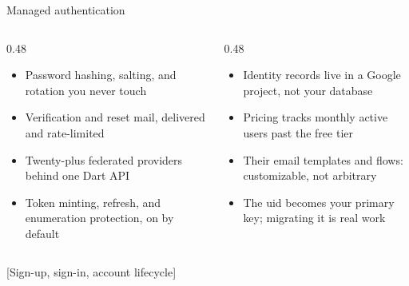 \documentclass[10pt,aspectratio=169,t]{beamer}
\begin{document}
\begin{frame}[eyebrow=Fundamentals]{Managed authentication}
  \vskip 2mm
  \begin{columns}[T]
    \begin{column}{0.48\textwidth}
      \begin{itemize}
        \item Password hashing, salting, and rotation you never touch
        \item Verification and reset mail, delivered and rate-limited
        \item Twenty-plus federated providers behind one Dart API
        \item Token minting, refresh, and enumeration protection, on by default
      \end{itemize}
    \end{column}
    \begin{column}{0.48\textwidth}
      \begin{itemize}
        \item Identity records live in a Google project, not your database
        \item Pricing tracks monthly active users past the free tier
        \item Their email templates and flows: customizable, not arbitrary
        \item The uid becomes your primary key; migrating it is real work
      \end{itemize}
    \end{column}
  \end{columns}
\end{frame}

[Sign-up, sign-in, account lifecycle]
\end{document}
